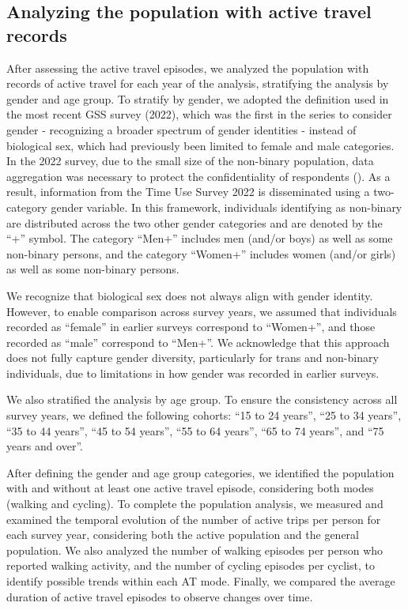 \documentclass[preprint, 3p,
authoryear]{elsarticle} %
\begin{document}
\subsection{Analyzing the population with active travel
records}\label{analyzing-the-population-with-active-travel-records}

After assessing the active travel episodes, we analyzed the population
with records of active travel for each year of the analysis, stratifying
the analysis by gender and age group. To stratify by gender, we adopted
the definition used in the most recent GSS survey (2022), which was the
first in the series to consider gender - recognizing a broader spectrum
of gender identities - instead of biological sex, which had previously
been limited to female and male categories. In the 2022 survey, due to
the small size of the non-binary population, data aggregation was
necessary to protect the confidentiality of respondents
(\citep{statisticscanada2025}). As a result, information from the Time
Use Survey 2022 is disseminated using a two-category gender variable. In
this framework, individuals identifying as non-binary are distributed
across the two other gender categories and are denoted by the ``+''
symbol. The category ``Men+'' includes men (and/or boys) as well as some
non-binary persons, and the category ``Women+'' includes women (and/or
girls) as well as some non-binary persons.

We recognize that biological sex does not always align with gender
identity. However, to enable comparison across survey years, we assumed
that individuals recorded as ``female'' in earlier surveys correspond to
``Women+'', and those recorded as ``male'' correspond to ``Men+''. We
acknowledge that this approach does not fully capture gender diversity,
particularly for trans and non-binary individuals, due to limitations in
how gender was recorded in earlier surveys.

We also stratified the analysis by age group. To ensure the consistency
across all survey years, we defined the following cohorts: ``15 to 24
years'', ``25 to 34 years'', ``35 to 44 years'', ``45 to 54 years'',
``55 to 64 years'', ``65 to 74 years'', and ``75 years and over''.

After defining the gender and age group categories, we identified the
population with and without at least one active travel episode,
considering both modes (walking and cycling). To complete the population
analysis, we measured and examined the temporal evolution of the number
of active trips per person for each survey year, considering both the
active population and the general population. We also analyzed the
number of walking episodes per person who reported walking activity, and
the number of cycling episodes per cyclist, to identify possible trends
within each AT mode. Finally, we compared the average duration of active
travel episodes to observe changes over time.
\end{document}
